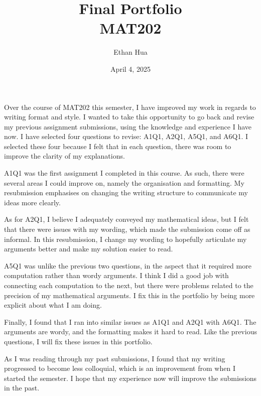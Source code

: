 \documentclass{eh-homework}
\begin{document}
    \title{Final Portfolio \\ MAT202}
    \author{Ethan Hua}
    \date{April 4, 2025}
    \maketitle
    \begin{question}[title=Introduction]{1}
        Over the course of MAT202 this semester, I have improved my work in regards to writing format and style. I wanted to take this opportunity to go back and revise my previous assignment submissions, using the knowledge and experience I have now. I have selected four questions to revise: A1Q1, A2Q1, A5Q1, and A6Q1. I selected these four because I felt that in each question, there was room to improve the clarity of my explanations.

    \smallskip

    A1Q1 was the first assignment I completed in this course. As such, there were several areas I could improve on, namely the organisation and formatting. My resubmission emphasises on changing the writing structure to communicate my ideas more clearly.

    \smallskip

    As for A2Q1, I believe I adequately conveyed my mathematical ideas, but I felt that there were issues with my wording, which made the submission come off as informal. In this resubmission, I change my wording to hopefully articulate my arguments better and make my solution easier to read.

    \smallskip

    A5Q1 was unlike the previous two questions, in the aspect that it required more computation rather than wordy arguments. I think I did a good job with connecting each computation to the next, but there were problems related to the precision of my mathematical arguments. I fix this in the portfolio by being more explicit about what I am doing.

    \smallskip

    Finally, I found that I ran into similar issues as A1Q1 and A2Q1 with A6Q1. The arguments are wordy, and the formatting makes it hard to read. Like the previous questions, I will fix these issues in this portfolio.

    \smallskip

    As I was reading through my past submissions, I found that my writing progressed to become less colloquial, which is an improvement from when I started the semester. I hope that my experience now will improve the submissions in the past.
    \end{question}
\end{document}
